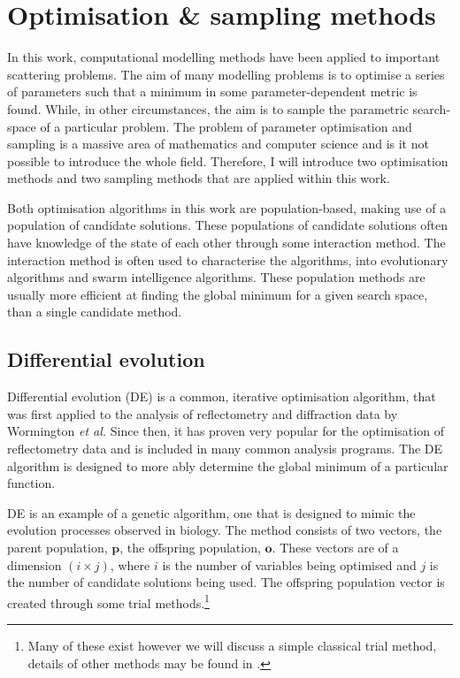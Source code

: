 \section{Optimisation \& sampling methods}
\label{sec:optimisation}
In this work, computational modelling methods have been applied to important scattering problems.
The aim of many modelling problems is to optimise a series of parameters such that a minimum in some parameter-dependent metric is found.
While, in other circumstances, the aim is to sample the parametric search-space of a particular problem.
The problem of parameter optimisation and sampling is a massive area of mathematics and computer science and is it not possible to introduce the whole field.
Therefore, I will introduce two optimisation methods and two sampling methods that are applied within this work.

Both optimisation algorithms in this work are population-based, making use of a population of candidate solutions.
These populations of candidate solutions often have knowledge of the state of each other through some interaction method.
The interaction method is often used to characterise the algorithms, into evolutionary algorithms and swarm intelligence algorithms.\autocite{wu_ensemble_2019}
These population methods are usually more efficient at finding the global minimum for a given search space, than a single candidate method.

\subsection{Differential evolution}
\label{sec:de}
Differential evolution (DE) is a common, iterative optimisation algorithm, that was first applied to the analysis of reflectometry and diffraction data by Wormington \emph{et al.}\autocite{wormington_characterization_1999}
Since then, it has proven very popular for the optimisation of reflectometry data and is included in many common analysis programs.\autocite{bjorck_fitting_2011,bjorck_genx_2007,nelson_co-refinement_2006,nelson_refnx_2019,ott_simulreflec_nodate,kienzle_ncnr_nodate}
The DE algorithm is designed to more ably determine the global minimum of a particular function.\autocite{storn_differential_1997}

DE is an example of a genetic algorithm, one that is designed to mimic the evolution processes observed in biology.\autocite{holland_adaptation_1992}
The method consists of two vectors, the parent population, $\mathbf{p}$, the offspring population, $\mathbf{o}$.
These vectors are of a dimension $(i\times j)$, where $i$ is the number of variables being optimised and $j$ is the number of candidate solutions being used.
The offspring population vector is created through some trial methods.\footnote{Many of these exist however we will discuss a simple classical trial method, details of other methods may be found in \cite{bjorck_fitting_2011}.}

